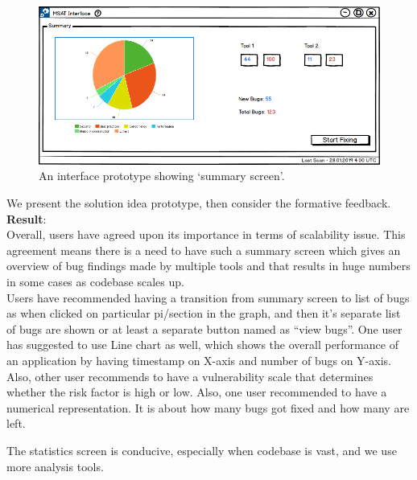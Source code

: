 \begin{figure}[hbt!]
	\centering
	\includegraphics[width=\linewidth]{figures/ux1_summary_screen}
	\caption{An interface prototype showing ‘summary screen’.}
	\label{fig:ux1_summary_screen}
\end{figure}

We present the solution idea prototype, then consider the formative feedback. \\

\textbf{Result}: \\

Overall, users have agreed upon its importance in terms of scalability issue. This agreement means there is a need to have such a summary screen which gives an overview of bug findings made by multiple tools and that results in huge numbers in some cases as codebase scales up. \\

Users have recommended having a transition from summary screen to list of bugs as when clicked on particular pi/section in the graph, and then it’s separate list of bugs are shown or at least a separate button named as “view bugs”. One user has suggested to use Line chart as well, which shows the overall performance of an application by having timestamp on X-axis and number of bugs on Y-axis. Also, other user recommends to have a vulnerability scale that determines whether the risk factor is high or low. Also, one user recommended to have a numerical representation. It is about how many bugs got fixed and how many are left. \\

\begin{myboxi}
	The statistics screen is conducive, especially when codebase is vast, and we use more analysis tools.
\end{myboxi}
\hfill \break
